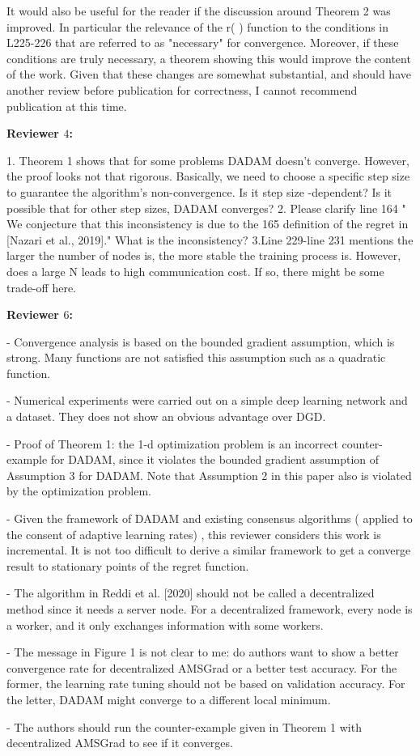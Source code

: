 \documentclass{article}
\begin{document}
It would also be useful for the reader if the discussion around Theorem 2 was improved. In particular the relevance of the r( ) function to the conditions in L225-226 that are referred to as "necessary" for convergence. Moreover, if these conditions are truly necessary, a theorem showing this would improve the content of the work. Given that these changes are somewhat substantial, and should have another review before publication for correctness, I cannot recommend publication at this time.

\textbf{Reviewer $4$:}

1. Theorem 1 shows that for some problems DADAM doesn't converge. However, the proof looks not that rigorous. Basically, we need to choose a specific step size to guarantee the algorithm's non-convergence. Is it step size -dependent? Is it possible that for other step sizes, DADAM converges?
2. Please clarify line 164 " We conjecture that this inconsistency is due to the
165 definition of the regret in [Nazari et al., 2019]." What is the inconsistency?
3.Line 229-line 231 mentions the larger the number of nodes is, the more stable the training process is. However, does a large N leads to high communication cost. If so, there might be some trade-off here.

\textbf{Reviewer $6$:}

- Convergence analysis is based on the bounded gradient assumption, which is strong. Many functions are not satisfied this assumption such as a quadratic function.

- Numerical experiments were carried out on a simple deep learning network and a dataset. They does not show an obvious advantage over DGD.

- Proof of Theorem 1: the 1-d optimization problem is an incorrect counter-example for DADAM, since it violates the bounded gradient assumption of Assumption 3 for DADAM. Note that Assumption 2 in this paper also is violated by the optimization problem.

- Given the framework of DADAM and existing consensus algorithms ( applied to the consent of adaptive learning rates) , this reviewer considers this work is incremental. It is not too difficult to derive a similar framework to get a converge result to stationary points of the regret function.

- The algorithm in Reddi et al. [2020] should not be called a decentralized method since it needs a server node. For a decentralized framework, every node is a worker, and it only exchanges information with some workers.

- The message in Figure 1 is not clear to me: do authors want to show a better convergence rate for decentralized AMSGrad or a better test accuracy. For the former, the learning rate tuning should not be based on validation accuracy. For the letter, DADAM might converge to a different local minimum.

- The authors should run the counter-example given in Theorem 1 with decentralized AMSGrad to see if it converges.
\end{document}
